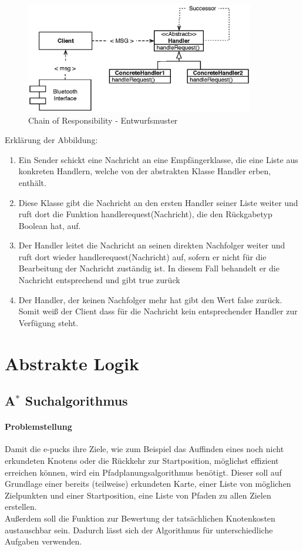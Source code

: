 \documentclass[10pt,a4paper]{article}
\begin{document}
			\begin{figure}[h]
				\centering
				\includegraphics[width=10cm]{images/android_handler.eps}
  				\caption{Chain of Responsibility - Entwurfsmuster}
  			\end{figure}	
  			Erklärung der Abbildung:
   			\begin{enumerate}
  				\item Ein Sender schickt eine Nachricht an eine Empfängerklasse, die eine Liste aus konkreten Handlern,
  					welche von der abstrakten Klasse Handler erben, enthält.
  				\item Diese Klasse gibt die Nachricht an den ersten Handler seiner Liste weiter und ruft dort die Funktion handlerequest(Nachricht),
  					die den Rückgabetyp Boolean hat, auf.
  				\item Der Handler leitet die Nachricht an seinen direkten Nachfolger weiter und ruft dort wieder handlerequest(Nachricht) auf, sofern
  					er nicht für die Bearbeitung der Nachricht zuständig ist. In diesem Fall behandelt er die Nachricht entsprechend und gibt true zurück
  				\item Der Handler, der keinen Nachfolger mehr hat gibt den Wert false zurück. Somit weiß der Client dass für die Nachricht kein
  					entsprechender Handler zur Verfügung steht.  					
  			\end{enumerate}   

	\section{Abstrakte Logik}

	\subsection{A$^\ast$ Suchalgorithmus}
		\label{subsec:astern}
		\paragraph{Problemstellung}
			Damit die e-pucks ihre Ziele, wie zum Beispiel das Auffinden eines noch nicht erkundeten Knotens oder die 
			Rückkehr zur Startposition, möglichst effizient erreichen können, wird ein Pfadplanungsalgorithmus benötigt. 
			Dieser soll auf Grundlage einer bereits (teilweise) erkundeten Karte, einer Liste von möglichen Zielpunkten 
			und einer Startposition, eine Liste von Pfaden zu allen Zielen erstellen.\\
			Außerdem soll die Funktion zur Bewertung der tatsächlichen Knotenkosten austauschbar sein. Dadurch lässt 
			sich der Algorithmus für unterschiedliche Aufgaben verwenden.
\end{document}
